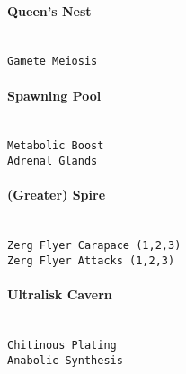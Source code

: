 \paragraph{Queen's Nest} \mbox{}\\
\verb|Gamete Meiosis|

\paragraph{Spawning Pool} \mbox{}\\
\verb|Metabolic Boost|\\
\verb|Adrenal Glands|

\paragraph{(Greater) Spire} \mbox{}\\
\verb|Zerg Flyer Carapace (1,2,3)|\\
\verb|Zerg Flyer Attacks (1,2,3)|

\paragraph{Ultralisk Cavern} \mbox{}\\
\verb|Chitinous Plating|\\
\verb|Anabolic Synthesis|
